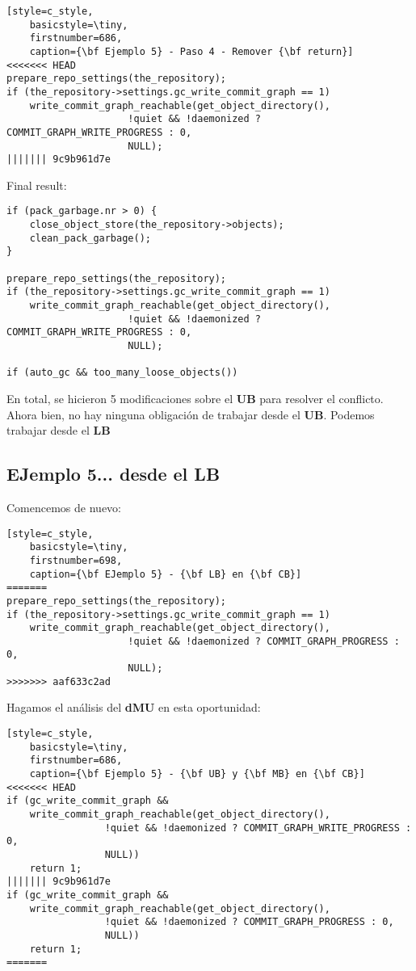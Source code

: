 \begin{lstlisting}[style=c_style,
	basicstyle=\tiny,
	firstnumber=686,
	caption={\bf Ejemplo 5} - Paso 4 - Remover {\bf return}]
<<<<<<< HEAD
prepare_repo_settings(the_repository);
if (the_repository->settings.gc_write_commit_graph == 1)
	write_commit_graph_reachable(get_object_directory(),
				     !quiet && !daemonized ? COMMIT_GRAPH_WRITE_PROGRESS : 0,
				     NULL);
||||||| 9c9b961d7e
\end{lstlisting}

Final result:
\begin{lstlisting}[style=c_style,
	basicstyle=\tiny,
	firstnumber=681,
	caption={\bf Ejemplo 5} - resultado final]
if (pack_garbage.nr > 0) {
	close_object_store(the_repository->objects);
	clean_pack_garbage();
}

prepare_repo_settings(the_repository);
if (the_repository->settings.gc_write_commit_graph == 1)
	write_commit_graph_reachable(get_object_directory(),
				     !quiet && !daemonized ? COMMIT_GRAPH_WRITE_PROGRESS : 0,
				     NULL);

if (auto_gc && too_many_loose_objects())
\end{lstlisting}

En total, se hicieron 5 modificaciones sobre el {\bf UB} para resolver el conflicto. Ahora bien, no hay ninguna obligación 
de trabajar desde el {\bf UB}. Podemos trabajar desde el {\bf LB}

\subsection{EJemplo 5... desde el LB}

Comencemos de nuevo:

\begin{lstlisting}[style=c_style,
	basicstyle=\tiny,
	firstnumber=698,
	caption={\bf EJemplo 5} - {\bf LB} en {\bf CB}]
=======
prepare_repo_settings(the_repository);
if (the_repository->settings.gc_write_commit_graph == 1)
	write_commit_graph_reachable(get_object_directory(),
				     !quiet && !daemonized ? COMMIT_GRAPH_PROGRESS : 0,
				     NULL);
>>>>>>> aaf633c2ad
\end{lstlisting}

Hagamos el análisis del {\bf dMU} en esta oportunidad:

\begin{lstlisting}[style=c_style,
	basicstyle=\tiny,
	firstnumber=686,
	caption={\bf Ejemplo 5} - {\bf UB} y {\bf MB} en {\bf CB}]
<<<<<<< HEAD
if (gc_write_commit_graph &&
    write_commit_graph_reachable(get_object_directory(),
				 !quiet && !daemonized ? COMMIT_GRAPH_WRITE_PROGRESS : 0,
				 NULL))
	return 1;
||||||| 9c9b961d7e
if (gc_write_commit_graph &&
    write_commit_graph_reachable(get_object_directory(),
				 !quiet && !daemonized ? COMMIT_GRAPH_PROGRESS : 0,
				 NULL))
	return 1;
=======
\end{lstlisting}

